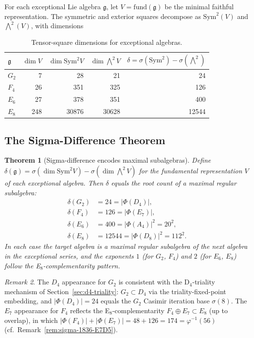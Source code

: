 \documentclass[11pt]{amsart}
\theoremstyle{plain}
\newtheorem{theorem}{Theorem}[section]
\theoremstyle{definition}
\theoremstyle{remark}
\newtheorem{remark}[theorem]{Remark}
\newcommand{\fg}{\mathfrak{g}}
\renewcommand{\Phi}{\varPhi}
\begin{document}
For each exceptional Lie algebra $\fg$, let $V = \mathrm{fund}(\fg)$ be
the minimal faithful representation.  The symmetric and exterior squares
decompose as $\mathrm{Sym}^2(V)$ and $\bigwedge^2(V)$, with dimensions

\begin{table}[h]
\centering
\caption{Tensor-square dimensions for exceptional algebras.}
\label{tab:sym2-wedge2}
\begin{tabular}{lrrrr}
\hline
$\fg$ & $\dim V$ & $\dim\mathrm{Sym}^2 V$ & $\dim\bigwedge^2 V$
      & $\delta = \sigma(\mathrm{Sym}^2) - \sigma(\bigwedge^2)$ \\
\hline
$G_2$ & 7  & 28  & 21  & 24 \\
$F_4$ & 26 & 351 & 325 & 126 \\
$E_6$ & 27 & 378 & 351 & 400 \\
$E_8$ & 248 & 30876 & 30628 & 12544 \\
\hline
\end{tabular}
\end{table}

\subsection{The Sigma-Difference Theorem}

\begin{theorem}[Sigma-difference encodes maximal subalgebras]%
\label{thm:sigma-diff}
Define $\delta(\fg) = \sigma(\dim\mathrm{Sym}^2 V) - \sigma(\dim\bigwedge^2 V)$
for the fundamental representation $V$ of each exceptional algebra.
Then $\delta$ equals the root count of a maximal regular subalgebra:
\begin{align*}
  \delta(G_2) &= 24 = |\Phi(D_4)|, \\
  \delta(F_4) &= 126 = |\Phi(E_7)|, \\
  \delta(E_6) &= 400 = |\Phi(A_4)|^2 = 20^2, \\
  \delta(E_8) &= 12544 = |\Phi(D_8)|^2 = 112^2.
\end{align*}
In each case the target algebra is a maximal regular subalgebra of the
next algebra in the exceptional series, and the exponents
$1$ (for $G_2$, $F_4$) and $2$ (for $E_6$, $E_8$) follow the
E$_8$-complementarity pattern.
\end{theorem}

\begin{remark}
The $D_4$ appearance for $G_2$ is consistent with the D$_4$-triality
mechanism of Section~\ref{sec:d4-triality}: $G_2 \subset D_4$ via
the triality-fixed-point embedding, and $|\Phi(D_4)| = 24$ equals the
$G_2$ Casimir iteration base $\sigma(8)$.
The $E_7$ appearance for $F_4$ reflects the E$_8$-complementarity
$F_4 \oplus E_7 \subset E_8$ (up to overlap), in which
$|\Phi(F_4)| + |\Phi(E_7)| = 48 + 126 = 174 = \varphi^{-1}(56)$
(cf.\ Remark~\ref{rem:sigma-1836-E7D5}).
\end{remark}
\end{document}
